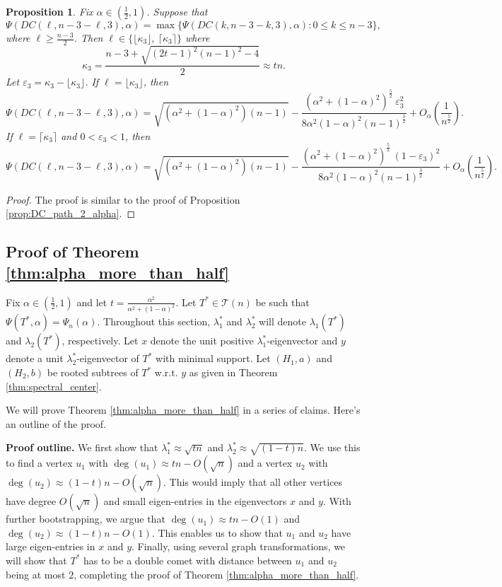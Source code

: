 \documentclass[11pt]{article}
\theoremstyle{plain}
\newtheorem{proposition}[theorem]{Proposition}
\numberwithin{equation}{section}
\begin{document}
\begin{proposition}\label{prop:DC_path_3_alpha} Fix $\alpha \in (\frac{1}{2}, 1)$. Suppose that 
\[ \Psi(DC(\ell,n-3-\ell, 3), \alpha) = \max\{\Psi(DC(k,n-3-k, 3), \alpha): 0\le k\le n-3\},\]
where $\ell\ge \frac{n-3}{2}$. Then $\ell\in \{\lfloor\kappa_3\rfloor, \ \lceil \kappa_3\rceil\}$
where 
\[ \kappa_3 = \frac{n-3+\sqrt{(2t-1)^2(n-1)^2-4}}{2}\approx tn.\]
Let $\varepsilon_3 = \kappa_3 - \lfloor \kappa_3\rfloor$. If $\ell = \lfloor\kappa_3\rfloor$, then
\[ \Psi(DC(\ell, n-3-\ell, 3), \alpha) = \sqrt{(\alpha^2+(1-\alpha)^2)(n-1)}-\frac{(\alpha^2 + (1-\alpha)^2)^{\frac{5}{2}}\ \varepsilon_3^2}{8\alpha^2(1-\alpha)^2(n-1)^{\frac{3}{2}}} + O_\alpha\left(\frac{1}{n^{\frac{5}{2}}}\right).\]
If $\ell = \lceil \kappa_3\rceil$ and $0<\varepsilon_3<1$, then 
\[ \Psi(DC(\ell, n-3-\ell, 3), \alpha) = 
\sqrt{(\alpha^2+(1-\alpha)^2)(n-1)}-\frac{(\alpha^2 + (1-\alpha)^2)^{\frac{5}{2}}\ (1-\varepsilon_3)^2}{8\alpha^2(1-\alpha)^2(n-1)^{\frac{3}{2}}} + O_\alpha\left(\frac{1}{n^{\frac{5}{2}}}\right).\]
\end{proposition}

\begin{proof}
    The proof is similar to the proof of Proposition \ref{prop:DC_path_2_alpha}.
\end{proof}

\subsection{Proof of Theorem \ref{thm:alpha_more_than_half}}

Fix $\alpha \in (\frac{1}{2}, 1)$ and let $t = \frac{\alpha^2}{\alpha^2 + (1-\alpha)^2}$. Let $T^*\in \mathcal{T}(n)$ be such that $\Psi(T^*,\alpha)=\Psi_n(\alpha)$.
Throughout this section, $\lambda_1^*$ and $\lambda_2^*$ will denote $\lambda_1(T^*)$ and $\lambda_2(T^*)$, respectively. Let $x$ denote the unit positive $\lambda_1^*$-eigenvector and $y$ denote a unit $\lambda_2^*$-eigenvector of $T^*$ with minimal support. Let $(H_1,a)$ and $(H_2,b)$ be rooted subtrees of $T^*$ w.r.t. $y$ as given in Theorem \ref{thm:spectral_center}.

We will prove Theorem \ref{thm:alpha_more_than_half} in a series of claims. Here's an outline of the proof.

\textbf{Proof outline.} We first show that  $\lambda_1^* \approx \sqrt{tn}$ and $\lambda_2^*\approx \sqrt{(1-t)n}$. 
We use this to find a vertex $u_1$ with $\deg(u_1)\approx tn - O(\sqrt{n})$ and a vertex $u_2$ with $\deg(u_2)\approx (1-t)n - O(\sqrt
n)$. This would imply that all other vertices have degree $O(\sqrt{n})$ and small eigen-entries in the eigenvectors $x$ and $y$. With further bootstrapping, we argue that $\deg(u_1)\approx tn - O(1)$ and $\deg(u_2)\approx (1-t)n -O(1)$. This enables us to show that $u_1$ and $u_2$ have large eigen-entries in $x$ and $y$. Finally, using several graph transformations, we will show that $T^*$ has to be a double comet with distance between $u_1$ and $u_2$ being at most $2$, completing the proof of Theorem \ref{thm:alpha_more_than_half}. 
\end{document}
